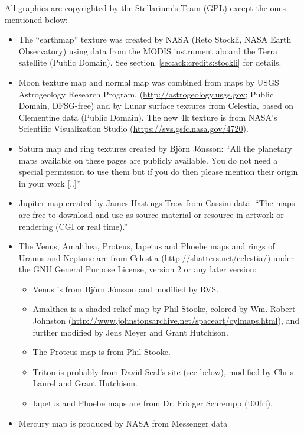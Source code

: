 All graphics are copyrighted by the Stellarium's Team (GPL) except the ones mentioned below:
\begin{itemize}		
\item The ``earthmap'' texture was created by NASA (Reto Stockli, NASA Earth
	  Observatory) using data from the MODIS instrument aboard the
	  Terra satellite (Public Domain). See section~\ref{sec:ack:credits:stockli} for details.
\item Moon texture map  and normal map was combined
  from maps by USGS Astrogeology Research Program,
  (\url{http://astrogeology.usgs.gov}; Public Domain, DFSG-free) and
  by Lunar surface textures from Celestia, based on Clementine data
  (Public Domain).  The new 4k texture is from NASA's Scientific
  Visualization Studio (\url{https://svs.gsfc.nasa.gov/4720}).
\item Saturn map and ring textures created by Björn Jónsson:
	  ``All the planetary maps available on these pages are publicly
	  available. You do not need a special permission to use them but if
	  you do then please mention their origin in your work [..]''
\item Jupiter map created by James Hastings-Trew from Cassini data. ``The 
	  maps are free to download and use as source material or resource
	  in artwork or rendering (CGI or real time).''
\item The Venus, Amalthea, Proteus, Iapetus and Phoebe maps and rings of Uranus and Neptune are from Celestia (\url{http://shatters.net/celestia/})
	  under the GNU General Purpose License, version 2 or any later version:
	  \begin{itemize}
	     \item Venus is from Björn Jónsson and modified by RVS.
	     \item Amalthea is a shaded relief map by Phil Stooke, colored by Wm. Robert Johnston 
	       (\url{http://www.johnstonsarchive.net/spaceart/cylmaps.html}),
	       and further modified by Jens Meyer and Grant Hutchison.
	     \item The Proteus map is from Phil Stooke.
	     \item Triton is probably from David Seal's site (see below), modified by Chris Laurel and Grant Hutchison.
	     \item Iapetus and Phoebe maps are from Dr. Fridger Schrempp (t00fri).
	  \end{itemize}
\item Mercury map is produced by NASA from Messenger data

\end{itemize}
